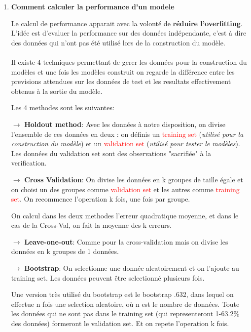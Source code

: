 \documentclass[a4paper, 11pt, onecolumn]{article}
\begin{document}
\begin{enumerate}

\item \textbf{Comment calculer la performance d'un modele}

  Le calcul de performance apparait avec la volonté de \textbf{réduire l'overfitting}. L'idée est d'evaluer la performance sur des données indépendante, c'est à dire des données qui n'ont pas été utilisé lors de la construction du modèle.

  \paragraph{}
Il existe 4 techniques permettant de gerer les données pour la construction du modèles et une fois les modèles construit on regarde la différence entre les previsions attendues sur les données de test et les resultats effectivement obtenus à la sortie du modèle.

Les 4 methodes sont les suivantes:

$\rightarrow$ \textbf{Holdout method}: Avec les données à notre disposition, on divise l'ensemble de ces données en deux : on définis un \textcolor{red}{training set} (\textit{utilisé pour la construction du modèle}) et un \textcolor{red}{validation set} (\textit{utilisé pour tester le modèles}). Les données du validation set sont des observations "sacrifiée" à la verification.

$\rightarrow$ \textbf{Cross Validation}: On divise les données en k groupes de taille égale et on choisi un des groupes comme \textcolor{red}{validation set} et les autres comme \textcolor{red}{training set}. On recommence l'operation k fois, une fois par groupe. 

On calcul dans les deux methodes l'erreur quadratique moyenne, et dans le cas de la Cross-Val, on fait la moyenne des k erreurs.

$\rightarrow$ \textbf{Leave-one-out}: Comme pour la cross-validation mais on divise les données en k groupes de 1 données. 

$\rightarrow$ \textbf{Bootstrap}: On selectionne une donnée aleatoirement et on l'ajoute au training set. Les données peuvent être selectionné plusieurs fois. 

Une version très utilisé du bootstrap est le bootstrap .632, dans lequel on effectue n fois une selection aleatoire,  où n est le nombre de données.
Toute les données qui ne sont pas dans le training set (qui representeront 1-63.2\% des données) formeront le validation set.
Et on repete l'operation k fois.

\end{enumerate}
\end{document}

